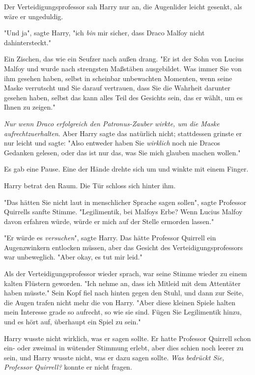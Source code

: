 {Der Verteidigungsprofessor sah Harry nur an, die Augenlider leicht gesenkt, als wäre er ungeduldig.

"Und ja", sagte Harry, "ich \emph{bin} mir sicher, dass Draco Malfoy nicht dahintersteckt."

Ein Zischen, das wie ein Seufzer nach außen drang. "Er ist der Sohn von Lucius Malfoy und wurde nach strengsten Maßstäben ausgebildet. Was immer Sie von ihm gesehen haben, selbst in scheinbar unbewachten Momenten, wenn seine Maske verrutscht und Sie darauf vertrauen, dass Sie die Wahrheit darunter gesehen haben, selbst das kann alles Teil des Gesichts sein, das er wählt, um es Ihnen zu zeigen."

\emph{Nur wenn Draco erfolgreich den Patronus-Zauber wirkte, um die Maske aufrechtzuerhalten}. Aber Harry sagte das natürlich nicht; stattdessen grinste er nur leicht und sagte: "Also entweder haben Sie \emph{wirklich} noch nie Dracos Gedanken gelesen, oder das ist nur das, was Sie mich glauben machen wollen."

Es gab eine Pause. Eine der Hände drehte sich um und winkte mit einem Finger.

Harry betrat den Raum. Die Tür schloss sich hinter ihm.

"Das hätten Sie nicht laut in menschlicher Sprache sagen sollen", sagte Professor Quirrells sanfte Stimme. "Legilimentik, bei Malfoys Erbe? Wenn Lucius Malfoy davon erfahren würde, würde er mich auf der Stelle ermorden lassen."

"Er würde es \emph{versuchen}", sagte Harry. Das hätte Professor Quirrell ein Augenzwinkern entlocken müssen, aber das Gesicht des Verteidigungsprofessors war unbeweglich. "Aber okay, es tut mir leid."

Als der Verteidigungsprofessor wieder sprach, war seine Stimme wieder zu einem kalten Flüstern geworden. "Ich nehme an, dass ich Mitleid mit dem Attentäter haben müsste." Sein Kopf fiel nach hinten gegen den Stuhl, und dann zur Seite, die Augen trafen nicht mehr die von Harry. "Aber diese kleinen Spiele halten mein Interesse grade so aufrecht, so wie sie sind. Fügen Sie Legilimentik hinzu, und es hört auf, überhaupt ein Spiel zu sein."

Harry wusste nicht wirklich, was er sagen sollte. Er hatte Professor Quirrell schon ein- oder zweimal in wütender Stimmung erlebt, aber dies schien noch leerer zu sein, und Harry wusste nicht, was er dazu sagen sollte. \emph{Was bedrückt Sie, Professor Quirrell?} konnte er nicht fragen.

}
